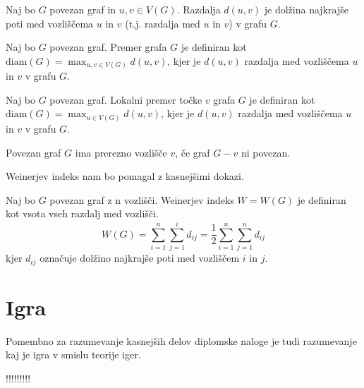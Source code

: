 \documentclass[fin1, tisk]{fmfdelo}
\begin{document}
\begin{definicija}
Naj bo $G$ povezan graf in $u, v \in V(G)$. Razdalja $d(u, v)$ je dolžina najkrajše poti med vozliščema $u$ in $v$ (t.j. razdalja med $u$ in $v$) v grafu $G$.
\end{definicija}

\begin{definicija}
Naj bo $G$ povezan graf. Premer grafa $G$ je definiran kot $\text{diam}(G) = \max_{u, v \in V(G)} d(u, v)$, kjer je $d(u, v)$ razdalja med vozliščema $u$ in $v$ v grafu $G$.
\end{definicija}

\begin{definicija}
Naj bo $G$ povezan graf. Lokalni premer točke $v$ grafa $G$ je definiran kot $\text{diam}(G) = \max_{u \in V(G)} d(u, v)$, kjer je $d(u, v)$ razdalja med vozliščema $u$ in $v$ v grafu $G$.
\end{definicija}

\begin{definicija}
Povezan graf $G$ ima prerezno vozlišče $v$, če graf $G - v$ ni povezan.
\end{definicija}


Weinerjev indeks nam bo pomagal z kasnejšimi dokazi.

\begin{definicija}
Naj bo $G$ povezan graf z n vozlišči. Weinerjev indeks $W = W(G)$ je definiran
kot vsota vseh razdalj med vozlišči.
$$W(G) = \sum_{i=1}^{n} \sum_{j=1}^{i} d_{ij} = \frac{1}{2} \sum_{i=1}^{n} \sum_{j=1}^{n} d_{ij}$$
kjer $d_{ij}$ označuje dolžino najkrajše poti med vozliščem $i$ in $j$.
\end{definicija}

\section{Igra}
Pomembno za razumevanje kasnejših delov diplomske naloge je tudi razumevanje kaj je igra v smislu teorije iger.


!!!!!!!!!
\end{document}

